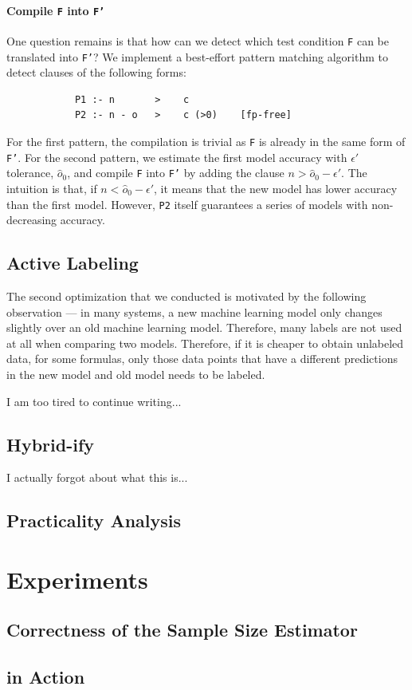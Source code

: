 \documentclass{article}
\begin{document}
\paragraph*{Compile \texttt{F} into \texttt{F'}} One question 
remains is that how can we detect which test condition
\texttt{F} can be translated into \texttt{F'}? We implement a
best-effort pattern matching algorithm to detect clauses
of the following forms:
\begin{verbatim}
            P1 :- n       >    c
            P2 :- n - o   >    c (>0)    [fp-free]
\end{verbatim}
For the first pattern, the compilation is trivial as
\texttt{F} is already in the same form of \texttt{F'}.
For the second pattern, we estimate the first model 
accuracy with $\epsilon'$ tolerance, $\hat{o}_0$,
and compile \texttt{F} into \texttt{F'} by adding
the clause $n > \hat{o}_0 - \epsilon'$.
The intuition is that, if $n < \hat{o}_0 - \epsilon'$,
it means that the new model has lower accuracy than
the first model. However, \texttt{P2} itself
guarantees a series of models with non-decreasing 
accuracy. 

\subsection{Active Labeling}
The second optimization that we conducted is motivated
by the following observation --- in many systems, 
a new machine learning model only changes slightly
over an old machine learning model. Therefore,
many labels are not used at all when comparing two models.
Therefore, if it is cheaper to obtain unlabeled data,
for some formulas, only those data points that
have a different predictions in the new model and
old model needs to be labeled.

I am too tired to continue writing...

\subsection{Hybrid-ify}

I actually forgot about what this is...

\subsection{Practicality Analysis}



\section{Experiments} 

\subsection{Correctness of the Sample Size Estimator}

\subsection{\sys in Action}
\end{document}
